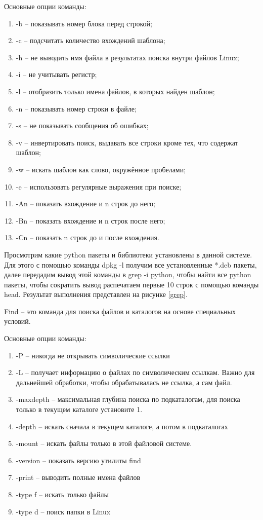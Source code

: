 Основные опции команды:
\begin{enumerate}
    \item -b -- показывать номер блока перед строкой;
    \item -c -- подсчитать количество вхождений шаблона;
    \item -h -- не выводить имя файла в результатах поиска внутри файлов Linux;
    \item -i -- не учитывать регистр;
    \item -l -- отобразить только имена файлов, в которых найден шаблон;
    \item -n -- показывать номер строки в файле;
    \item -s -- не показывать сообщения об ошибках;
    \item -v -- инвертировать поиск, выдавать все строки кроме тех, что содержат шаблон;
    \item -w -- искать шаблон как слово, окружённое пробелами;
    \item -e -- использовать регулярные выражения при поиске;
    \item -An -- показать вхождение и n строк до него;
    \item -Bn -- показать вхождение и n строк после него;
    \item -Cn -- показать n строк до и после вхождения.
\end{enumerate}

Просмотрим какие python пакеты и библиотеки установлены в данной системе. Для этого с помощью команды dpkg -l получим все установленные *.deb пакеты, далее передадим вывод этой команды в grep -i python, чтобы найти все python пакеты, чтобы сократить вывод распечатаем первые 10 строк с помощью команды head. Результат выполнения представлен на рисунке \ref{grep}. 


Find -- это команда для поиска файлов и каталогов на основе специальных условий. 

Основные опции команды:
\begin{enumerate}
    \item -P -- никогда не открывать символические ссылки
    \item -L -- получает информацию о файлах по символическим ссылкам. Важно для дальнейшей обработки, чтобы обрабатывалась не ссылка, а сам файл.
    \item -maxdepth -- максимальная глубина поиска по подкаталогам, для поиска только в текущем каталоге установите 1.
    \item -depth -- искать сначала в текущем каталоге, а потом в подкаталогах
    \item -mount -- искать файлы только в этой файловой системе.
    \item -version -- показать версию утилиты find
    \item -print -- выводить полные имена файлов
    \item -type f -- искать только файлы
    \item -type d -- поиск папки в Linux
\end{enumerate}

